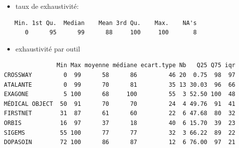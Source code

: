 \documentclass[]{article}
\providecommand{\tightlist}{%
  \setlength{\itemsep}{0pt}\setlength{\parskip}{0pt}}
\begin{document}
\begin{itemize}
\tightlist
\item
  taux de exhaustivité:
\end{itemize}

\begin{verbatim}
   Min. 1st Qu.  Median    Mean 3rd Qu.    Max.    NA's 
      0      95      99      88     100     100       8 
\end{verbatim}

\begin{itemize}
\tightlist
\item
  exhaustivité par outil
\end{itemize}

\begin{verbatim}
               Min Max moyenne médiane ecart.type Nb   Q25 Q75 iqr
CROSSWAY         0  99      58      86         46 20  0.75  98  97
ATALANTE         0  99      70      81         35 13 30.03  96  66
EXAGONE          5 100      68     100         55  3 52.50 100  48
MÉDICAL OBJECT  50  91      70      70         24  4 49.76  91  41
FIRSTNET        31  87      61      60         22  6 47.68  80  32
ORBIS           16  97      37      18         40  6 15.70  39  23
SIGEMS          55 100      77      77         32  3 66.22  89  22
DOPASOIN        72 100      86      87         12  6 76.00  97  21
\end{verbatim}
\end{document}
